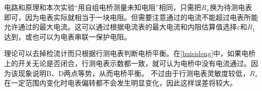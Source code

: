 \documentclass[]{../../templates/Report}%
\begin{document}
\begin{fullreportonly}
    电路和原理和本次实验“用自组电桥测量未知电阻”相同，只需把$R_x$换为待测电表即可，因为电表实际就相当于一块电阻。但需要注意通过的电流不能超过电表所能允许通过的最大电流。这可以通过根据电流表的最大电流和内阻估算值选择$\varepsilon$和$R_1$达到，或也可以为电表串联一保护电阻。

    理论可以去掉检流计而只根据行测电表判断电桥平衡。在\cref{huisideng}中，如果电桥上的开关无论是否闭合，行测电表示数都一致，就可认为电桥中没有电流通过。因为该现象说明B、D两点等势，从而电桥平衡。
    不过由于行测电表灵敏度较低，$R_s$在一定范围内变化时电表偏转都不会发生明显变化，因此这样误差将较大。

\end{fullreportonly}
\insertnotes
\end{document}
